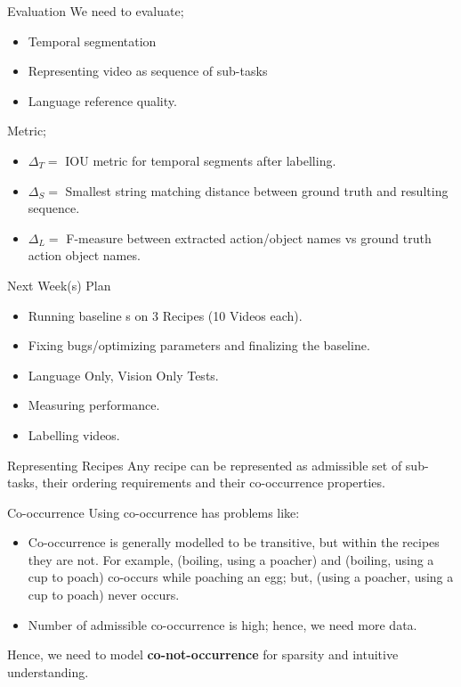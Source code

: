 \begin{frame}{Evaluation}
We need to evaluate;
\begin{itemize}
\item Temporal segmentation
\item Representing video as sequence of sub-tasks
\item Language reference quality.
\end{itemize}

Metric;
\begin{itemize}
\item $\Delta_T=$ IOU metric for temporal segments after labelling.
\item $\Delta_S=$ Smallest string matching distance between ground truth and resulting sequence.
\item $\Delta_L=$ F-measure between extracted action/object names vs ground truth action object names.
\end{itemize}
\end{frame}

\begin{frame}{Next Week(s) Plan}
\begin{itemize}
\item Running baseline s on 3 Recipes (10 Videos each).
\item Fixing bugs/optimizing parameters and finalizing the baseline.
\item Language Only, Vision Only Tests.
\item Measuring performance.
\item Labelling videos.
\end{itemize}
\end{frame}

\begin{frame}{Representing Recipes}
Any recipe can be represented as admissible set of sub-tasks, their ordering requirements and their co-occurrence properties.
\end{frame}

\begin{frame}{Co-occurrence}
 Using co-occurrence has problems like:
\begin{itemize}
\item Co-occurrence is generally modelled to be transitive, but within the recipes they are not. For example, (boiling, using a poacher) and (boiling, using a cup to poach) co-occurs while poaching an egg; but, (using a poacher, using a cup to poach) never occurs.
\item Number of admissible co-occurrence is high; hence, we need more data.
\end{itemize}
Hence, we need to model {\bf co-not-occurrence} for sparsity and intuitive understanding.
\end{frame}

